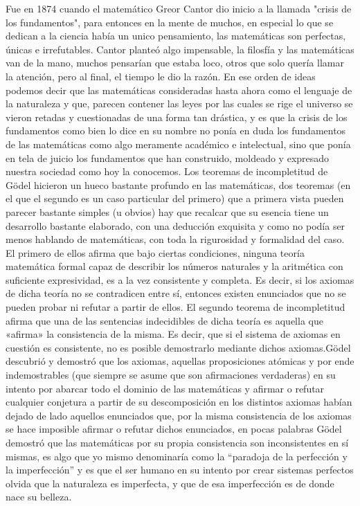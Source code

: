 \documentclass{article}
\begin{document}
Fue en 1874 cuando el matemático Greor Cantor dio inicio a la  llamada "crisis de los fundamentos", para entonces en la mente de muchos, en especial lo que se dedican a la ciencia había un unico pensamiento, las matemáticas son perfectas, únicas e irrefutables. Cantor planteó algo impensable, la filosfía y las matemáticas van de la mano, muchos pensarían que estaba loco, otros que solo quería llamar la atención, pero al final, el tiempo le dio la razón. 
\newline
En ese orden de ideas podemos decir que las matemáticas consideradas hasta ahora como el lenguaje de la naturaleza y que, parecen contener las leyes por las cuales se rige el universo se vieron retadas y cuestionadas de una forma tan drástica, y es que la crisis de los fundamentos como bien lo dice en su nombre no ponía en duda los fundamentos de las matemáticas como algo meramente académico e intelectual, sino que ponía en tela de juicio los fundamentos que han construido, moldeado y expresado nuestra sociedad como hoy la conocemos. Los teoremas de incompletitud de Gödel hicieron un hueco bastante profundo en las matemáticas, dos teoremas (en el que el segundo es un caso particular del primero) que a primera vista pueden parecer bastante simples (u obvios) hay que recalcar que su esencia tiene un desarrollo bastante elaborado, con una deducción exquisita y como no podía ser menos hablando de matemáticas, con toda la rigurosidad y formalidad del caso.
\newpage
El primero de ellos afirma que bajo ciertas condiciones, ninguna teoría matemática formal capaz de describir los números naturales y la aritmética con suficiente expresividad, es a la vez consistente y completa. Es decir, si los axiomas de dicha teoría no se contradicen entre sí, entonces existen enunciados que no se pueden probar ni refutar a partir de ellos. El segundo teorema de incompletitud afirma que una de las sentencias indecidibles de dicha teoría es aquella que «afirma» la consistencia de la misma. Es decir, que si el sistema de axiomas en cuestión es consistente, no es posible demostrarlo mediante dichos axiomas.Gödel descubrió y demostró que los axiomas, aquellas proposiciones atómicas y por ende indemostrables (que siempre se asume que son afirmaciones verdaderas) en su intento por abarcar todo el dominio de las matemáticas y afirmar o refutar cualquier conjetura a partir de su descomposición en los distintos axiomas habían dejado de lado aquellos enunciados que, por la misma consistencia de los axiomas se hace imposible afirmar o refutar dichos enunciados, en pocas palabras Gödel demostró que las matemáticas por su propia consistencia son inconsistentes en sí mismas, es algo que yo mismo denominaría como la “paradoja de la perfección y la imperfección” y es que el ser humano en su intento por crear sistemas perfectos olvida que la naturaleza es imperfecta, y que de esa imperfección es de donde nace su belleza. 
\end{document}
